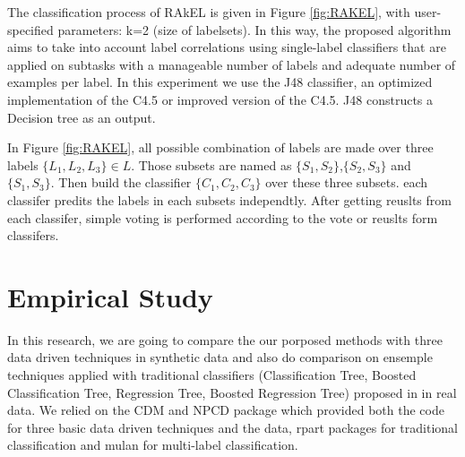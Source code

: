 \documentclass[12pt]{article}
\begin{document}
The classification process of RAkEL is given in Figure \ref{fig:RAKEL}, with user-specified parameters:  k=2 (size of labelsets). In this way, the proposed algorithm aims to take into account label correlations using single-label classifiers that are applied on subtasks with a manageable number of labels and adequate number of examples per label. In this experiment we use the  J48 classifier, an optimized  implementation of the  C4.5 or improved version of the  C4.5. J48 constructs a Decision tree as an output.  


In Figure \ref{fig:RAKEL}, all possible combination of labels are made over three labels $\{L_1,L_2,L_3\} \in L$. Those subsets are named as $\{S_1,S_2\}$,$\{S_2,S_3\}$ and $\{S_1,S_3\}$. Then build the classifier $\{C_1,C_2,C_3\}$ over these three subsets. each classifer predits the labels in each subsets independtly. After getting reuslts from each classifer, simple voting is performed according to the vote or reuslts form classifers.    




\section{Empirical Study}

 In this research, we are going to compare the our porposed methods with three data driven techniques\cite{chiu2013statistical,de2008empirically,de2009dina,desmarais2013matrix} in synthetic data and also do comparison on ensemple techniques applied with traditional classifiers (Classification Tree, Boosted Classification Tree, Regression Tree, Boosted Regression Tree) proposed in\cite{desmarais2015combining} in real data. We relied on the CDM \cite{CDM} and NPCD package which provided both the code for three basic data driven techniques and the data, rpart packages for traditional classification and mulan \cite{Tsoumakas2010MLD} for multi-label classification. 
  
\end{document}
